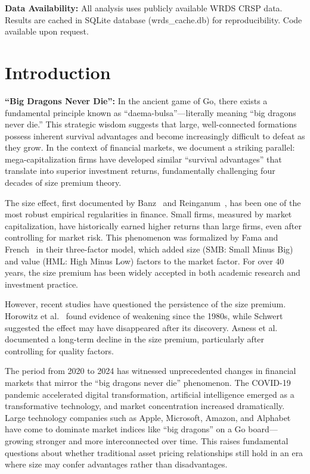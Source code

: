 \documentclass[10pt,letterpaper]{article}
\begin{document}
\textbf{Data Availability:} All analysis uses publicly available WRDS CRSP data. Results are cached in SQLite database (wrds\_cache.db) for reproducibility. Code available upon request.

\linenumbers

\section*{Introduction}

\textbf{``Big Dragons Never Die'':} In the ancient game of Go, there exists a fundamental principle known as ``daema-bulsa''---literally meaning ``big dragons never die.'' This strategic wisdom suggests that large, well-connected formations possess inherent survival advantages and become increasingly difficult to defeat as they grow. In the context of financial markets, we document a striking parallel: mega-capitalization firms have developed similar ``survival advantages'' that translate into superior investment returns, fundamentally challenging four decades of size premium theory.

The size effect, first documented by Banz~\cite{banz1981} and Reinganum~\cite{reinganum1981}, has been one of the most robust empirical regularities in finance. Small firms, measured by market capitalization, have historically earned higher returns than large firms, even after controlling for market risk. This phenomenon was formalized by Fama and French~\cite{fama1993} in their three-factor model, which added size (SMB: Small Minus Big) and value (HML: High Minus Low) factors to the market factor. For over 40 years, the size premium has been widely accepted in both academic research and investment practice.

However, recent studies have questioned the persistence of the size premium. Horowitz et al.~\cite{horowitz2000} found evidence of weakening since the 1980s, while Schwert~\cite{schwert2003} suggested the effect may have disappeared after its discovery. Asness et al.~\cite{asness2018} documented a long-term decline in the size premium, particularly after controlling for quality factors.

The period from 2020 to 2024 has witnessed unprecedented changes in financial markets that mirror the ``big dragons never die'' phenomenon. The COVID-19 pandemic accelerated digital transformation, artificial intelligence emerged as a transformative technology, and market concentration increased dramatically. Large technology companies such as Apple, Microsoft, Amazon, and Alphabet have come to dominate market indices like ``big dragons'' on a Go board---growing stronger and more interconnected over time. This raises fundamental questions about whether traditional asset pricing relationships still hold in an era where size may confer advantages rather than disadvantages.
\end{document}
